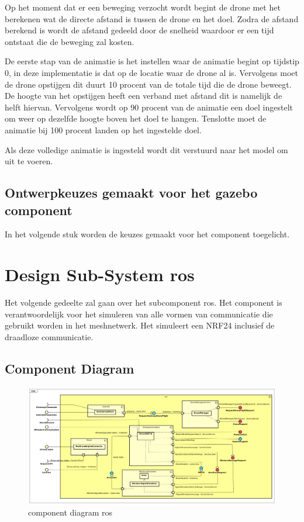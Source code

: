 \documentclass[a4paper, 11pt, oneside]{report}
\begin{document}
Op het moment dat er een beweging verzocht wordt begint de drone met het berekenen wat de directe afstand is tussen de drone en het doel.
Zodra de afstand berekend is wordt de afstand gedeeld door de snelheid waardoor er een tijd ontstaat die de beweging zal kosten.

De eerste stap van de animatie is het instellen waar de animatie begint op tijdstip 0, in deze implementatie is dat op de locatie waar de drone al is.
Vervolgens moet de drone opstijgen dit duurt 10 procent van de totale tijd die de drone beweegt.
De hoogte van het opstijgen heeft een verband met afstand dit is namelijk de helft hiervan.
Vervolgens wordt op 90 procent van de animatie een doel ingestelt om weer op dezelfde hoogte boven het doel te hangen.
Tenslotte moet de animatie bij 100 procent landen op het ingestelde doel.

Als deze volledige animatie is ingesteld wordt dit verstuurd naar het model om uit te voeren.    
 

\subsection{Ontwerpkeuzes gemaakt voor het gazebo component}
\label{DetailedDesign:gazebo:ontwerkeuzes}
In het volgende stuk worden de keuzes gemaakt voor het component toegelicht.


\section{Design Sub-System ros}
\label{DetailedDesign:WirelessSimulatie}
Het volgende gedeelte zal gaan over het subcomponent ros. Het component is verantwoordelijk voor het simuleren van alle vormen van communicatie die gebruikt worden in het meshnetwerk. Het simuleert een NRF24 inclusief de draadloze communicatie.

\subsection{Component Diagram}
\label{DetailedDesign:ros:ComponentDiagram}
\begin{figure}[H]
	\begin{center}\includegraphics[width=\linewidth]{Afbeeldingen/rosComponentDiagram.png}\end{center}
	\caption{component diagram ros}
	\label{fig:component:ros}
\end{figure}
\end{document}
